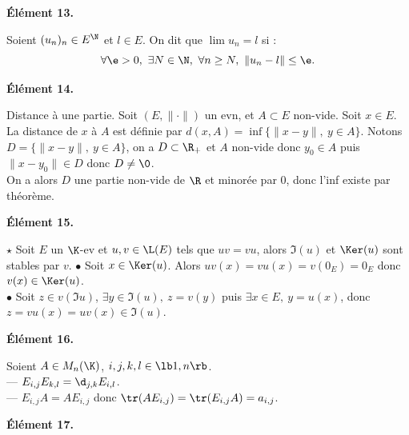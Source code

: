 \documentclass[11pt]{article}
\begin{document}
\bf{Élément 13.}

\begin{defi}{}{}
    Soient $(u_n)_n \in E^\N$ et $l\in E$. On dit que $\lim u_n = l$ si :
    \begin{equation*}
        \forall \e > 0, ~ \exists N \in \N, ~ \forall n \geq N, ~ \|u_n - l\| \leq \e.
    \end{equation*}
\end{defi}

\bf{Élément 14.}

\begin{defi}{Distance à une partie.}{}
    Soit $(E,\|\cdot\|)$ un evn, et $A\subset E$ non-vide. Soit $x\in E$.\\
    La distance de $x$ à $A$ est définie par $d(x,A)=\inf\{\|x-y\|, ~ y \in A\}$.
    \tcblower
    Notons $D=\{\|x-y\|, ~ y \in A\}$, on a $D\subset\R_+$ et $A$ non-vide donc $y_0\in A$ puis $\|x-y_0\|\in D$ donc $D\neq\0$.\\
    On a alors $D$ une partie non-vide de $\R$ et minorée par 0, donc l'inf existe par théorème. 
\end{defi}

\bf{Élément 15.}

\begin{prop}{$\star$}{}
    Soit $E$ un $\K$-ev et $u,v\in\L(E)$ tels que $uv=vu$, alors $\Im(u)$ et $\Ker(u)$ sont stables par $v$.
    \tcblower
    $\bullet$ Soit $x\in\Ker(u)$. Alors $uv(x)=vu(x)=v(0_E)=0_E$ donc $v(x)\in\Ker(u)$.\\
    $\bullet$ Soit $z\in v(\Im u)$, $\exists y \in \Im(u), ~ z=v(y)$ puis $\exists x \in E, ~ y=u(x)$, donc $z=vu(x)=uv(x)\in\Im(u)$.
\end{prop}

\bf{Élément 16.}

\begin{ex}{}{}
    Soient $A\in M_n(\K)$, $i,j,k,l\in\lb1,n\rb$.\\
    --- $E_{i,j}E_{k,l}=\d_{j,k}E_{i,l}$.\\
    --- $E_{i,j}A=AE_{i,j}$ donc $\tr(AE_{i,j})=\tr(E_{i,j}A)=a_{i,j}$.
\end{ex}

\bf{Élément 17.}
\end{document}

